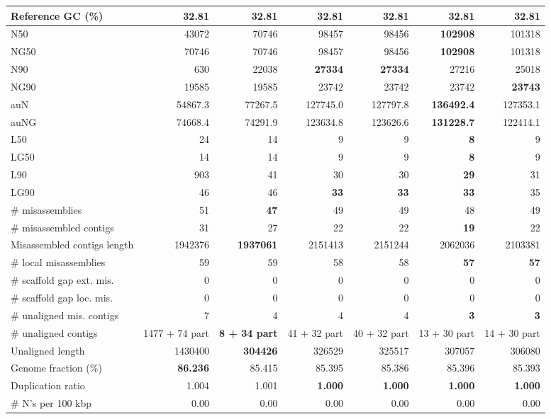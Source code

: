 \documentclass[12pt,a4paper]{article}
\begin{document}
\begin{table}[ht]
\begin{center}
\begin{tabular}{|l*{6}{|r}|}
Reference GC (\%) & 32.81 & 32.81 & 32.81 & 32.81 & 32.81 & 32.81 \\ \hline
N50 & 43072 & 70746 & 98457 & 98456 & {\bf 102908} & 101318 \\ \hline
NG50 & 70746 & 70746 & 98457 & 98456 & {\bf 102908} & 101318 \\ \hline
N90 & 630 & 22038 & {\bf 27334} & {\bf 27334} & 27216 & 25018 \\ \hline
NG90 & 19585 & 19585 & 23742 & 23742 & 23742 & {\bf 23743} \\ \hline
auN & 54867.3 & 77267.5 & 127745.0 & 127797.8 & {\bf 136492.4} & 127353.1 \\ \hline
auNG & 74668.4 & 74291.9 & 123634.8 & 123626.6 & {\bf 131228.7} & 122414.1 \\ \hline
L50 & 24 & 14 & 9 & 9 & {\bf 8} & 9 \\ \hline
LG50 & 14 & 14 & 9 & 9 & {\bf 8} & 9 \\ \hline
L90 & 903 & 41 & 30 & 30 & {\bf 29} & 31 \\ \hline
LG90 & 46 & 46 & {\bf 33} & {\bf 33} & {\bf 33} & 35 \\ \hline
\# misassemblies & 51 & {\bf 47} & 49 & 49 & 48 & 49 \\ \hline
\# misassembled contigs & 31 & 27 & 22 & 22 & {\bf 19} & 22 \\ \hline
Misassembled contigs length & 1942376 & {\bf 1937061} & 2151413 & 2151244 & 2062036 & 2103381 \\ \hline
\# local misassemblies & 59 & 59 & 58 & 58 & {\bf 57} & {\bf 57} \\ \hline
\# scaffold gap ext. mis. & 0 & 0 & 0 & 0 & 0 & 0 \\ \hline
\# scaffold gap loc. mis. & 0 & 0 & 0 & 0 & 0 & 0 \\ \hline
\# unaligned mis. contigs & 7 & 4 & 4 & 4 & {\bf 3} & {\bf 3} \\ \hline
\# unaligned contigs & 1477 + 74 part & {\bf 8 + 34 part} & 41 + 32 part & 40 + 32 part & 13 + 30 part & 14 + 30 part \\ \hline
Unaligned length & 1430400 & {\bf 304426} & 326529 & 325517 & 307057 & 306080 \\ \hline
Genome fraction (\%) & {\bf 86.236} & 85.415 & 85.395 & 85.386 & 85.396 & 85.393 \\ \hline
Duplication ratio & 1.004 & 1.001 & {\bf 1.000} & {\bf 1.000} & {\bf 1.000} & {\bf 1.000} \\ \hline
\# N's per 100 kbp & 0.00 & 0.00 & 0.00 & 0.00 & 0.00 & 0.00 \\ \hline

\end{tabular}
\end{center}
\end{table}
\end{document}
